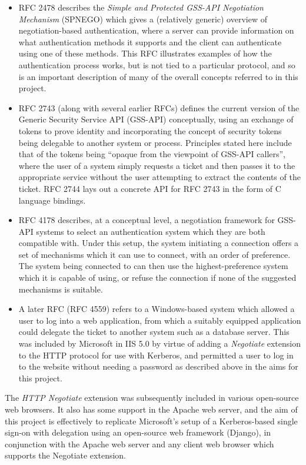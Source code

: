 \documentclass[12pt]{report}
\begin{document}
\begin{itemize}
\item
  RFC 2478\cite{RFC2478} describes the \textit{Simple and Protected GSS-API Negotiation Mechanism} (SPNEGO) which gives a (relatively generic) overview of negotiation-based authentication, where a server can provide information on what authentication methods it supports and the client can authenticate using one of these methods. This RFC illustrates examples of how the authentication process works, but is not tied to a particular protocol, and so is an important description of many of the overall concepts referred to in this project.
\item
  RFC 2743\cite{RFC2743} (along with several earlier RFCs) defines the current version of the Generic Security Service API (GSS-API) conceptually, using an exchange of tokens to prove identity and incorporating the concept of security tokens being delegable to another system or process. Principles stated here include that of the tokens being ``opaque from the viewpoint of GSS-API callers'', where the user of a system simply requests a ticket and then passes it to the appropriate service without the user attempting to extract the contents of the ticket. RFC 2744\cite{RFC2744} lays out a concrete API for RFC 2743 in the form of C language bindings.
\item
  RFC 4178\cite{RFC4178} describes, at a conceptual level, a negotiation framework for GSS-API systems to select an authentication system which they are both compatible with. Under this setup, the system initiating a connection offers a set of mechanisms which it can use to connect, with an order of preference. The system being connected to can then use the highest-preference system which it is capable of using, or refuse the connection if none of the suggested mechanisms is suitable.
\item
  A later RFC (RFC 4559\cite{RFC4559}) refers to a Windows-based system which allowed a user to log into a web application, from which a suitably equipped application could delegate the ticket to another system such as a database server. This was included by Microsoft in IIS 5.0 by virtue of adding a \textit{Negotiate} extension to the HTTP protocol for use with Kerberos, and permitted a user to log in to the website without needing a password as described above in the aims for this project.
\end{itemize}

The \textit{HTTP Negotiate} extension was subsequently included in various open-source web browsers. It also has some support in the Apache web server, and the aim of this project is effectively to replicate Microsoft's setup of a Kerberos-based single sign-on with delegation using an open-source web framework (Django), in conjunction with the Apache web server and any client web browser which supports the Negotiate extension.
\end{document}
